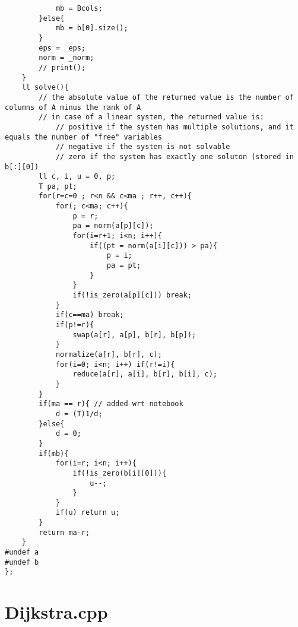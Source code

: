 \documentclass[a4paper,landscape,8pt]{extarticle}
\begin{document}
\begin{multicols}{3}
\begin{lstlisting}
            mb = Bcols;
        }else{
            mb = b[0].size();
        }
        eps = _eps;
        norm = _norm;
        // print();
    }
    ll solve(){
        // the absolute value of the returned value is the number of columns of A minus the rank of A
        // in case of a linear system, the returned value is:
            // positive if the system has multiple solutions, and it equals the number of "free" variables
            // negative if the system is not solvable
            // zero if the system has exactly one soluton (stored in b[:][0])
        ll c, i, u = 0, p;
        T pa, pt;
        for(r=c=0 ; r<n && c<ma ; r++, c++){
            for(; c<ma; c++){
                p = r;
                pa = norm(a[p][c]);
                for(i=r+1; i<n; i++){
                    if((pt = norm(a[i][c])) > pa){
                        p = i;
                        pa = pt;
                    }
                }
                if(!is_zero(a[p][c])) break;
            }
            if(c==ma) break;
            if(p!=r){
                swap(a[r], a[p], b[r], b[p]);
            }
            normalize(a[r], b[r], c);
            for(i=0; i<n; i++) if(r!=i){
                reduce(a[r], a[i], b[r], b[i], c);
            }
        }
        if(ma == r){ // added wrt notebook
            d = (T)1/d;
        }else{
            d = 0;
        }
        if(mb){
            for(i=r; i<n; i++){
                if(!is_zero(b[i][0])){
                    u--;
                }
            }
            if(u) return u;
        }
        return ma-r;
    }
#undef a
#undef b
};
\end{lstlisting}

\section*{Dijkstra.cpp}


\end{multicols}
\end{document}
